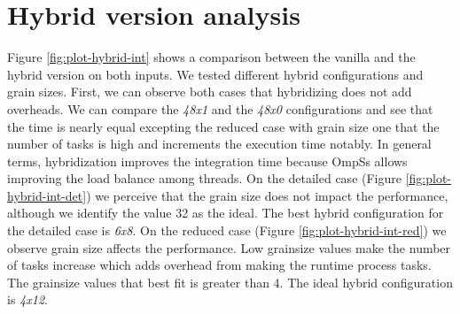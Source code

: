 \section{Hybrid version analysis}

Figure \ref{fig:plot-hybrid-int} shows a comparison between the vanilla and the hybrid version on both inputs. We tested different hybrid configurations and grain sizes. First, we can observe both cases that hybridizing does not add overheads. We can compare the \textit{48x1} and the \textit{48x0} configurations and see that the time is nearly equal excepting the reduced case with grain size one that the number of tasks is high and increments the execution time notably. In general terms, hybridization improves the integration time because OmpSs allows improving the load balance among threads. On the detailed case (Figure \ref{fig:plot-hybrid-int-det}) we perceive that the grain size does not impact the performance, although we identify the value 32 as the ideal. The best hybrid configuration for the detailed case is \textit{6x8}. On the reduced case (Figure \ref{fig:plot-hybrid-int-red}) we observe grain size affects the performance. Low grainsize values make the number of tasks increase which adds overhead from making the runtime process tasks. The grainsize values that best fit is greater than 4. The ideal hybrid configuration is \textit{4x12}.


